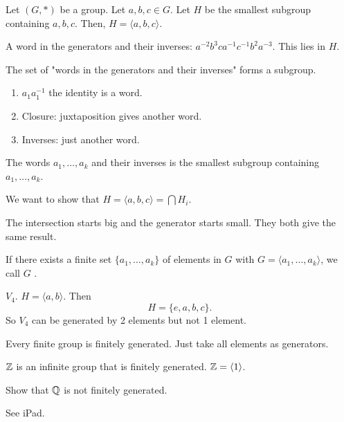 \documentclass[class=article,crop=false]{standalone}
\begin{document}
\begin{thm}[]
	Let $( G,*)$ be a group. Let  $ a,b,c \in G$. Let $ H$ be the smallest subgroup containing  $ a,b,c$. Then,  $ H=\langle a,b,c \rangle$.  
\end{thm}
\begin{eg}[]
A word in the generators and their inverses: $a^{-2}b^3ca^{-1}c^{-1}b^2a^{-3} $. This lies in $ H$.
\end{eg}
\begin{thm}[]
The set of "words in the generators and their inverses" forms a subgroup.
\end{thm}
\begin{prf}
\begin{enumerate}[label=(\roman*)]
	\item $ a_1 a_1^{-1}$ the identity is a word.
	\item Closure: juxtaposition gives another word.
	\item Inverses: just another word.
\end{enumerate}
\end{prf}
\begin{thm}[]
The words $ a_1,\ldots,a_k$ and their inverses is the smallest subgroup containing $ a_1,\ldots,a_k$.
\end{thm}

\begin{prf}
We want to show that $ H = \langle a,b,c \rangle = \bigcap H_i$. 
\end{prf}
\begin{intuition}
	The intersection starts big and the generator starts small. They both give the same result.
\end{intuition}

\begin{defn}
	If there exists a finite set $ \{a_1,\ldots,a_k\} $ of elements in $ G$ with  $ G=\langle a_1,\ldots,a_k \rangle$, we call  $ G$  . 
\end{defn}

\begin{eg}[]
$ V_4$. 
 $ H=\langle a,b \rangle$. Then
 \[
 H=\{e,a,b,c\} 
 .\] 
 So $ V_4$ can be generated by 2 elements but not 1 element.
\end{eg}

\begin{note}[]
	Every finite group is finitely generated. Just take all elements as generators.
\end{note}

\begin{eg}[]
	$ \mathbb{Z}$ is an infinite group that is finitely generated.  $ \mathbb{Z} = \langle 1 \rangle$.
\end{eg}
\begin{eg}[Challenge]
	Show that $ \mathbb{Q}$ is not finitely generated.
\end{eg}

\begin{eg}[Figure 7.11(b)]
See iPad.
\end{eg}
\end{document}
